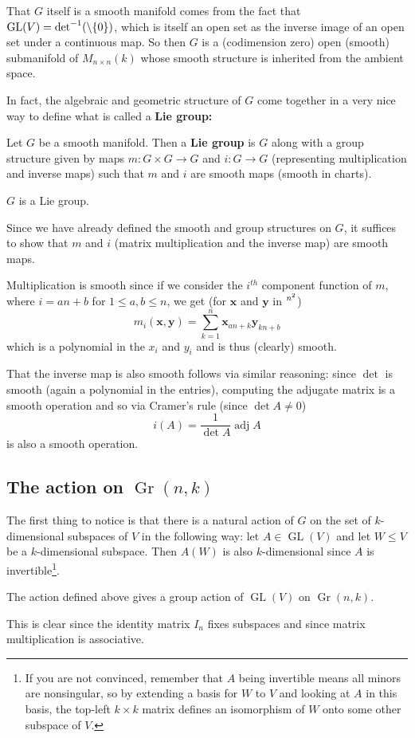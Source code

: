\documentclass[12pt]{article}
\DeclareMathOperator{\Gr}{Gr}
\DeclareMathOperator{\GL}{GL}
\let\k\relax
\newcommand{\k}{\mathbbm{k}}
\begin{document}
That $G$ itself is a smooth manifold comes from the fact that $\GL(V)=\det^{-1}(\k\setminus\{0\})$, which is 
itself an open set as the inverse image of an open set under a continuous map. So then $G$ is a (codimension zero) open (smooth) submanifold
of $M_{n\times n}(k)$ whose smooth structure is inherited from the ambient space.

In fact, the algebraic and geometric structure of $G$ come together in a very nice way to define what is called 
a \textbf{Lie group:}
\begin{defn}
	Let $G$ be a smooth manifold. Then a \textbf{Lie group} is $G$ along with a group structure given by maps $m:G\times G\to G$ and $i:G\to G$
	(representing multiplication and inverse maps) such that $m$ and $i$ are smooth maps (smooth in charts).
\end{defn}

\begin{prop}
	$G$ is a Lie group.
\end{prop}
\begin{prf}
	Since we have already defined the smooth and group structures on $G$, it suffices to show that 
	$m$ and $i$ (matrix multiplication and the inverse map) are smooth maps.

	Multiplication is smooth since if we consider the $i^{th}$ component function of $m$, where $i=an+b$ for $1\le a,b\le n$, we get (for $\mathbf x$ and $\mathbf y$ in $\k^{n^2}$)
	\[m_i(\mathbf x,\mathbf y)=\sum_{k=1}^{n}\mathbf x_{an+k}\mathbf y_{kn+b}\]
	which is a polynomial in the $x_i$ and $y_i$ and is thus (clearly) smooth.

	That the inverse map is also smooth follows via similar reasoning: since $\det$ is smooth (again a polynomial in the entries),
	computing the adjugate matrix is a smooth operation and so via Cramer's rule (since $\det A\ne 0$)
	\[i(A)=\frac{1}{\det A}\operatorname{adj}A\]
	is also a smooth operation.
\end{prf}

\subsection{The action on \texorpdfstring{$\Gr(n,k)$}{Gr(n,k)}}
The first thing to notice is that there is a natural action 
of $G$ on the set of $k$-dimensional subspaces of $V$ in the following way: let $A\in\GL(V)$ and let $W\le V$ be a $k$-dimensional 
subspace. Then $A(W)$ is also $k$-dimensional since $A$ is invertible\footnote{If you are not convinced, remember that $A$ being invertible means all minors are nonsingular,
so by extending a basis for $W$ to $V$ and looking at $A$ in this basis, the top-left $k\times k$ matrix defines an isomorphism 
of $W$ onto some other subspace of $V$.}.
\begin{prop}
	The action defined above gives a group action of $\GL(V)$ on $\Gr(n,k)$.
\end{prop}
\begin{prf}
	This is clear since the identity matrix $I_n$ fixes subspaces and since matrix multiplication is associative.
\end{prf}
\end{document}
